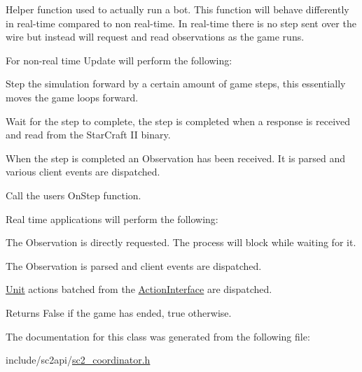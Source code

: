 Helper function used to actually run a bot. This function will behave differently in real-\/time compared to non real-\/time. In real-\/time there is no step sent over the wire but instead will request and read observations as the game runs.
\begin{DoxyItemize}
\item For non-\/real time Update will perform the following\+:
\begin{DoxyEnumerate}
\item Step the simulation forward by a certain amount of game steps, this essentially moves the game loops forward.
\item Wait for the step to complete, the step is completed when a response is received and read from the Star\+Craft II binary.
\begin{DoxyItemize}
\item When the step is completed an Observation has been received. It is parsed and various client events are dispatched.
\end{DoxyItemize}
\item Call the user\textquotesingle{}s On\+Step function.
\end{DoxyEnumerate}
\item Real time applications will perform the following\+:
\begin{DoxyEnumerate}
\item The Observation is directly requested. The process will block while waiting for it.
\item The Observation is parsed and client events are dispatched.
\item \hyperlink{classsc2_1_1_unit}{Unit} actions batched from the \hyperlink{classsc2_1_1_action_interface}{Action\+Interface} are dispatched. \begin{DoxyReturn}{Returns}
False if the game has ended, true otherwise. 
\end{DoxyReturn}

\end{DoxyEnumerate}
\end{DoxyItemize}

The documentation for this class was generated from the following file\+:\begin{DoxyCompactItemize}
\item 
include/sc2api/\hyperlink{sc2__coordinator_8h}{sc2\+\_\+coordinator.\+h}\end{DoxyCompactItemize}
